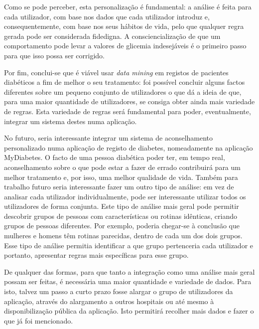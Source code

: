 Como se pode perceber, esta personalização é fundamental: a análise é feita para cada utilizador, com base nos dados que cada utilizador introduz e, consequentemente, com base nos seus hábitos de vida, pelo que qualquer regra gerada pode ser considerada fidedigna. A consciencialização de que um comportamento pode levar a valores de glicemia indesejáveis é o primeiro passo para que isso possa ser corrigido. 

Por fim, conclui-se que é viável usar \textit{data mining} em registos de pacientes diabéticos a fim de melhor o seu tratamento: foi possível concluir alguns factos diferentes sobre um pequeno conjunto de utilizadores o que dá a ideia de que, para uma maior quantidade de utilizadores, se consiga obter ainda mais variedade de regras. Esta variedade de regras será fundamental para poder, eventualmente, integrar um sistema destes numa aplicação.


No futuro, seria interessante integrar um sistema de aconselhamento personalizado numa aplicação de registo de diabetes, nomeadamente na aplicação MyDiabetes. O facto de uma pessoa diabética poder ter, em tempo real, aconselhamento sobre o que pode estar a fazer de errado contribuirá para um melhor tratamento e, por isso, uma melhor qualidade de vida. Também para trabalho futuro seria interessante fazer um outro tipo de análise: em vez de analisar cada utilizador individualmente, pode ser interessante utilizar todos os utilizadores de forma conjunta. Este tipo de análise mais geral pode permitir descobrir grupos de pessoas com características ou rotinas idênticas, criando grupos de pessoas diferentes. Por exemplo, poderia chegar-se à conclusão que mulheres e homens têm rotinas parecidas, dentro de cada um dos dois grupos. Esse tipo de análise permitia identificar a que grupo pertenceria cada utilizador e portanto, apresentar regras mais específicas para esse grupo. 

De qualquer das formas, para que tanto a integração como uma análise mais geral possam ser feitas, é necessária uma maior quantidade e variedade de dados. Para isto, talvez um passo a curto prazo fosse alargar o grupo de utilizadores da aplicação, através do alargamento a outros hospitais ou até mesmo à disponibilização pública da aplicação. Isto permitirá recolher mais dados e fazer o que já foi mencionado.
